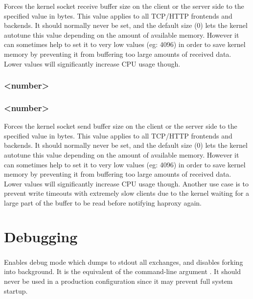 Forces the kernel socket receive buffer size on the client or the server side
to the specified value in bytes. This value applies to all TCP/HTTP frontends
and backends. It should normally never be set, and the default size (0) lets
the kernel autotune this value depending on the amount of available memory.
However it can sometimes help to set it to very low values (eg: 4096) in
order to save kernel memory by preventing it from buffering too large amounts
of received data. Lower values will significantly increase CPU usage though.

\subsubsection[tune.sndbuf.client]{ <number>}
\subsubsection[tune.sndbuf.server]{ <number>}

Forces the kernel socket send buffer size on the client or the server side to
the specified value in bytes. This value applies to all TCP/HTTP frontends
and backends. It should normally never be set, and the default size (0) lets
the kernel autotune this value depending on the amount of available memory.
However it can sometimes help to set it to very low values (eg: 4096) in
order to save kernel memory by preventing it from buffering too large amounts
of received data. Lower values will significantly increase CPU usage though.
Another use case is to prevent write timeouts with extremely slow clients due
to the kernel waiting for a large part of the buffer to be read before
notifying haproxy again.

\section{Debugging}
\label{sec:debugging}

\subsubsection[debug]{}

Enables debug mode which dumps to stdout all exchanges, and disables forking
into background. It is the equivalent of the command-line argument . It
should never be used in a production configuration since it may prevent full
system startup.

